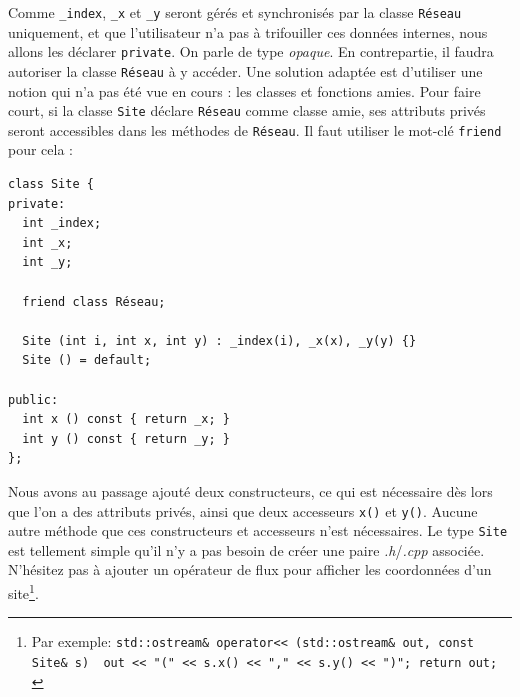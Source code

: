 \documentclass{book}
\newcommand{\inline}[1]{\texttt{#1}}
\def\filename{\emph}
\begin{document}
Comme \inline{_index}, \inline{_x} et \inline{_y} seront gérés et synchronisés par la classe \inline{Réseau} uniquement, et que l'utilisateur n'a pas à trifouiller ces données internes, nous allons les déclarer \inline{private}. On parle de type \emph{opaque}. En contrepartie, il faudra autoriser la classe \inline{Réseau} à y accéder. Une solution adaptée est d'utiliser une notion qui n'a pas été vue en cours : les classes et fonctions amies. Pour faire court, si la classe \inline{Site} déclare \inline{Réseau} comme classe amie, ses attributs privés seront accessibles dans les méthodes de \inline{Réseau}. Il faut utiliser le mot-clé \inline{friend} pour cela :
\begin{verbatim}
class Site {
private:
  int _index;
  int _x;
  int _y;

  friend class Réseau;

  Site (int i, int x, int y) : _index(i), _x(x), _y(y) {}
  Site () = default;

public:
  int x () const { return _x; }
  int y () const { return _y; }
};
\end{verbatim}
Nous avons au passage ajouté deux constructeurs, ce qui est nécessaire dès lors que l'on a des attributs privés, ainsi que deux accesseurs \inline{x()} et \inline{y()}. Aucune autre méthode que ces constructeurs et accesseurs n'est nécessaires. Le type \inline{Site} est tellement simple qu'il n'y a pas besoin de créer une paire \filename{.h}/\filename{.cpp} associée. N'hésitez pas à ajouter un opérateur de flux pour afficher les coordonnées d'un site\footnote{Par exemple: \inline{std::ostream& operator<< (std::ostream& out, const Site& s) { out << "(" << s.x() << "," << s.y() << ")"; return out; }}}.\\
\end{document}
